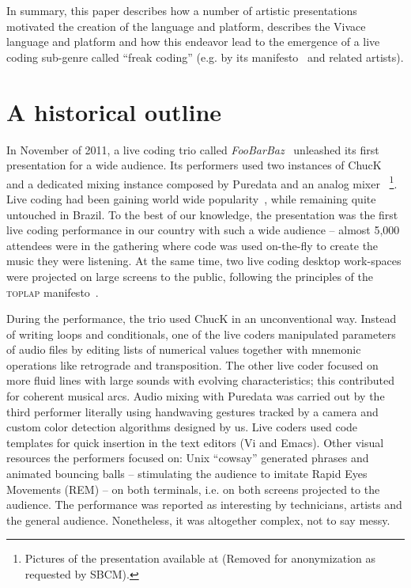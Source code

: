 \documentclass[12pt,times,twocolumn]{article}
\begin{document}
In summary, this paper describes how
a number of artistic presentations motivated the creation of the language and platform,
describes the Vivace language and platform and how this endeavor
lead to the emergence of a live coding sub-genre
called ``freak coding'' (e.g. by its manifesto~\cite{freak} and related artists).

\section{A historical outline} %
In November of 2011, a live coding trio called
\textit{FooBarBaz}~\cite{foobarbaz} unleashed its first presentation
for a wide audience. Its performers used two instances of
ChucK~\cite{wang2003chuck} and a dedicated mixing instance composed by Puredata and an analog
mixer
~\footnote{Pictures of the presentation available at
  (Removed for anonymization as requested by SBCM).}.
  Live coding had been gaining world wide popularity~\cite{nilson2007live,
  collins2003live, brown2007a, collins2011live}, while remaining quite
untouched in Brazil.
To the best of our knowledge, the presentation
was the first live coding performance in our country with such a wide audience -- almost 5,000
attendees were in the gathering where code was used on-the-fly to
create the music they were listening.
At the same time, two live coding desktop work-spaces were projected on large screens to the
public, following the principles of the \textsc{toplap} manifesto~\cite{ward2004live}.

During the performance, the trio used ChucK in an unconventional
way. Instead of writing loops and conditionals, one of the live coders
manipulated parameters of audio files by editing lists of numerical
values together with mnemonic operations like retrograde and
transposition. The other live coder focused on more fluid lines with
large sounds with evolving characteristics; this contributed for coherent
musical arcs. Audio mixing with Puredata was carried out by
the third performer literally using handwaving gestures tracked by a
camera and custom color detection algorithms designed by us. Live coders
used code templates for quick insertion in the text editors (Vi
and Emacs).
Other visual resources the performers focused on:
Unix ``cowsay'' generated phrases and animated bouncing balls
-- stimulating the audience to imitate Rapid Eyes
Movements (REM) -- on both terminals, i.e. on both screens projected to the audience.
The performance was reported as interesting by technicians,
artists and the general audience.
Nonetheless, it was altogether complex, not to say messy.
\end{document}
